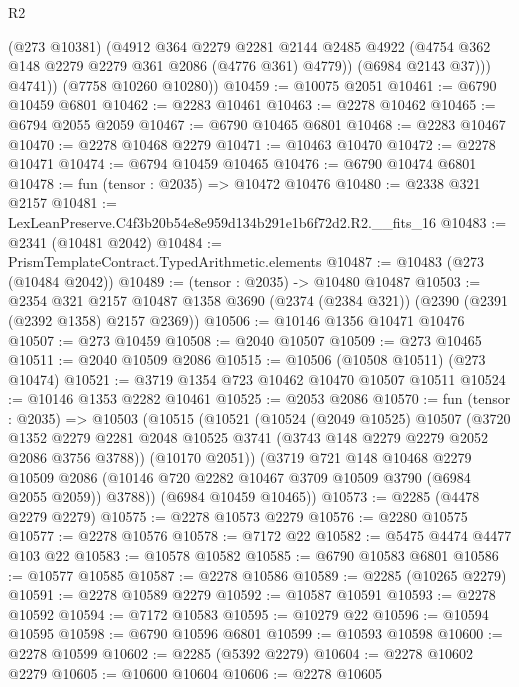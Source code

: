 \begin{lexlean}{R2}
\begin{coremodule}
              (@273 @10381)
              (@4912
                @364
                @2279
                @2281
                @2144
                @2485
                @4922
                (@4754 @362 @148 @2279 @2279 @361 @2086 (@4776 @361) @4779))
              (@6984 @2143 @37)))
          @4741))
      (@7758 @10260 @10280))
@10459 := @10075 @2051
@10461 := @6790 @10459 @6801
@10462 := @2283 @10461
@10463 := @2278 @10462
@10465 := @6794 @2055 @2059
@10467 := @6790 @10465 @6801
@10468 := @2283 @10467
@10470 := @2278 @10468 @2279
@10471 := @10463 @10470
@10472 := @2278 @10471
@10474 := @6794 @10459 @10465
@10476 := @6790 @10474 @6801
@10478 := fun (tensor : @2035) => @10472 @10476
@10480 := @2338 @321 @2157
@10481 := LexLeanPreserve.C4f3b20b54e8e959d134b291e1b6f72d2.R2.__fits_16
@10483 := @2341 (@10481 @2042)
@10484 := PrismTemplateContract.TypedArithmetic.elements
@10487 := @10483 (@273 (@10484 @2042))
@10489 := (tensor : @2035) -> @10480 @10487
@10503 := @2354
    @321
    @2157
    @10487
    @1358
    @3690
    (@2374 (@2384 @321))
    (@2390 (@2391 (@2392 @1358) @2157 @2369))
@10506 := @10146 @1356 @10471 @10476
@10507 := @273 @10459
@10508 := @2040 @10507
@10509 := @273 @10465
@10511 := @2040 @10509 @2086
@10515 := @10506 (@10508 @10511) (@273 @10474)
@10521 := @3719 @1354 @723 @10462 @10470 @10507 @10511
@10524 := @10146 @1353 @2282 @10461
@10525 := @2053 @2086
@10570 := fun (tensor : @2035) =>
  @10503
    (@10515
      (@10521
        (@10524
          (@2049 @10525)
          @10507
          (@3720
            @1352
            @2279
            @2281
            @2048
            @10525
            @3741
            (@3743 @148 @2279 @2279 @2052 @2086 @3756 @3788))
          (@10170 @2051))
        (@3719
          @721
          @148
          @10468
          @2279
          @10509
          @2086
          (@10146 @720 @2282 @10467 @3709 @10509 @3790 (@6984 @2055 @2059))
          @3788))
      (@6984 @10459 @10465))
@10573 := @2285 (@4478 @2279 @2279)
@10575 := @2278 @10573 @2279
@10576 := @2280 @10575
@10577 := @2278 @10576
@10578 := @7172 @22
@10582 := @5475 @4474 @4477 @103 @22
@10583 := @10578 @10582
@10585 := @6790 @10583 @6801
@10586 := @10577 @10585
@10587 := @2278 @10586
@10589 := @2285 (@10265 @2279)
@10591 := @2278 @10589 @2279
@10592 := @10587 @10591
@10593 := @2278 @10592
@10594 := @7172 @10583
@10595 := @10279 @22
@10596 := @10594 @10595
@10598 := @6790 @10596 @6801
@10599 := @10593 @10598
@10600 := @2278 @10599
@10602 := @2285 (@5392 @2279)
@10604 := @2278 @10602 @2279
@10605 := @10600 @10604
@10606 := @2278 @10605

\end{coremodule}
\end{lexlean}
